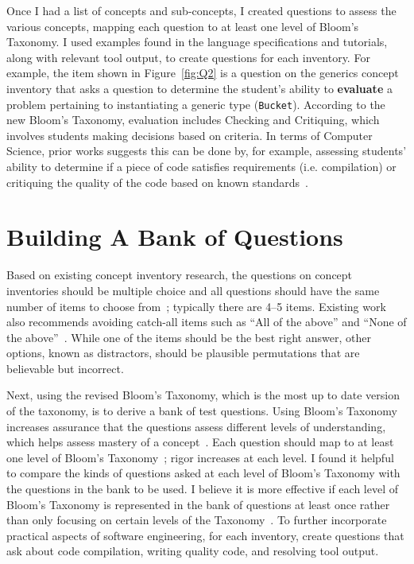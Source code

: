 Once I had a list of concepts and sub-concepts, I created questions to assess the various concepts, mapping each question to at least one level of Bloom's Taxonomy. I used examples found in the language specifications and tutorials, along with relevant tool output, to create questions for each inventory. For example, the item shown in Figure~\ref{fig:Q2} is a question on the generics concept inventory that asks a question to determine the student's ability to \textbf{evaluate} a problem pertaining to instantiating a generic type (\texttt{Bucket}). According to the new Bloom's Taxonomy, evaluation includes Checking and Critiquing, which involves students making decisions based on criteria. In terms of Computer Science, prior works suggests this can be done by, for example, assessing students' ability to determine if a piece of code satisfies requirements (i.e. compilation) or critiquing the quality of the code based on known standards~\cite{thompson2008bloom}.

\section{Building A Bank of Questions}

Based on existing concept inventory research, the questions on concept inventories should be multiple choice and all questions should have the same number of items to choose from~\cite{tew2010developing}; typically there are 4--5 items. Existing work also recommends avoiding catch-all items such as ``All of the above'' and ``None of the above''~\cite{tew2010developing}. While one of the items should be the best right answer, other options, known as distractors, should be plausible permutations that are believable but incorrect. 

Next, using the revised Bloom's Taxonomy, which is the most up to date version of the taxonomy, is to derive a bank of test questions. Using Bloom's Taxonomy increases assurance that the questions assess different levels of understanding, which helps assess mastery of a concept~\cite{scott2003bloom, thompson2008bloom}. Each question should map to at least one level of Bloom's Taxonomy~\cite{starr2008bloom,khairuddin2008application}; rigor increases at each level. I found it helpful to compare the kinds of questions asked at each level of Bloom's Taxonomy with the questions in the bank to be used. I believe it is more effective if each level of Bloom's Taxonomy is represented in the bank of questions at least once rather than only focusing on certain levels of the Taxonomy~\cite{scott2003bloom}. 
To further incorporate practical aspects of software engineering, for each inventory, create questions that ask about code compilation, writing quality code, and resolving tool output. 

